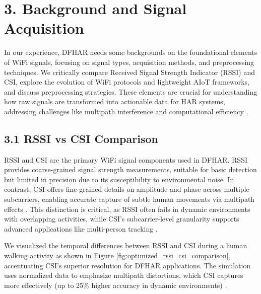 \documentclass[Afour,sageh,times]{sagej}
\begin{document}

\section{3. Background and Signal Acquisition}
\label{sec: bg and sa}
In our experience, DFHAR needs some backgrounds on the foundational elements of WiFi signals, focusing on signal types, acquisition methods, and preprocessing techniques.
We critically compare Received Signal Strength Indicator (RSSI) and CSI, explore the evolution of WiFi protocols and lightweight AIoT frameworks, and discuss preprocessing strategies. These elements are crucial for understanding how raw signals are transformed into actionable data for HAR systems, addressing challenges like multipath interference and computational efficiency \citep{guo2019robust, yang2022autofi, ding2020wihi}.

\subsection{3.1 RSSI vs CSI Comparison}
RSSI and CSI are the primary WiFi signal components used in DFHAR. RSSI provides coarse-grained signal strength measurements, suitable for basic detection but limited in precision due to its susceptibility to environmental noise. In contrast, CSI offers fine-grained details on amplitude and phase across multiple subcarriers, enabling accurate capture of subtle human movements via multipath effects \citep{yang2022autofi, xie2015precise}. This distinction is critical, as RSSI often fails in dynamic environments with overlapping activities, while CSI's subcarrier-level granularity supports advanced applications like multi-person tracking \citep{venkatnarayan2018multiperson}.

We visualized the temporal differences between RSSI and CSI during a human walking activity as shown in Figure \ref{fig:optimized_rssi_csi_comparison}, accentuating CSI's superior resolution for DFHAR applications. The simulation uses normalized data to emphasize multipath distortions, which CSI captures more effectively (up to 25\% higher accuracy in dynamic environments) \citep{guo2019robust, islam2022stc, venkatnarayan2018multiperson}. 
\end{document}

